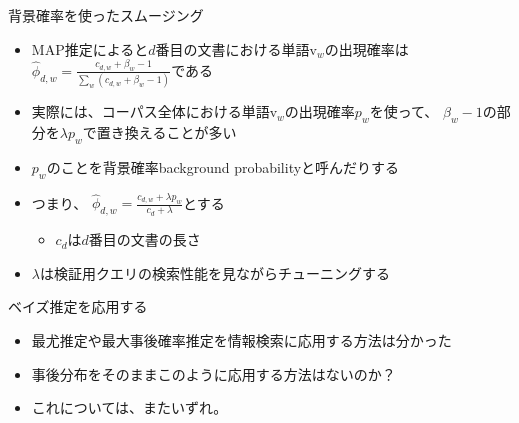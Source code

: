 \documentclass[aspectratio=169,unicode,dvipdfmx,14pt]{beamer}
\begin{document}
\begin{frame}{背景確率を使ったスムージング}
\begin{itemize}
\item MAP推定によると$d$番目の文書における単語$\mbox{v}_w$の出現確率は
$\hat{\phi}_{d,w} = \frac{c_{d,w} + \beta_w - 1}{\sum_w (c_{d,w} + \beta_w - 1)}$である
\item 実際には、コーパス全体における単語$\mbox{v}_w$の出現確率$p_w$を使って、
$\beta_w - 1$の部分を$\lambda p_w$で置き換えることが多い
\item $p_w$のことを背景確率background probabilityと呼んだりする
\item つまり、
$\hat{\phi}_{d,w} = \frac{c_{d,w} + \lambda p_w}{c_d + \lambda}$とする
\begin{itemize}
\item $c_d$は$d$番目の文書の長さ
\end{itemize}
\item $\lambda$は検証用クエリの検索性能を見ながらチューニングする
\end{itemize}
\end{frame}


\begin{frame}{ベイズ推定を応用する}
\begin{itemize}
\item 最尤推定や最大事後確率推定を情報検索に応用する方法は分かった
\item 事後分布をそのままこのように応用する方法はないのか？
\item これについては、またいずれ。
\end{itemize}
\end{frame}
\end{document}
